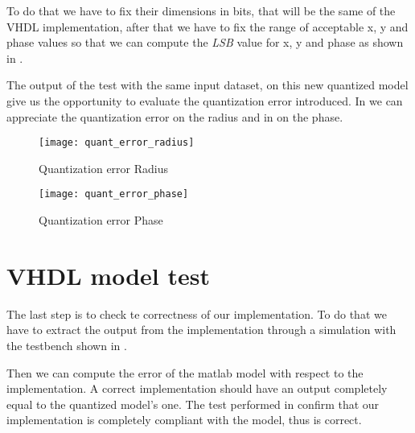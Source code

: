 To do that we have to fix their dimensions in bits, that will be the same of the
VHDL implementation, after that we have to fix the range of acceptable x, y and
phase values so that we can compute the \emph{LSB} value for x, y and phase as
shown in .



The output of the test with the same input dataset, on this new quantized model
give us the opportunity to evaluate the quantization error introduced. In
 we can appreciate the quantization error on the radius
and in  on the phase.


\begin{figure}[ht]
	\texttt{[image: quant\_error\_radius]}
	\caption{Quantization error Radius}\label{fig:qerrorradius}
\end{figure}
\begin{figure}[ht]
	\texttt{[image: quant\_error\_phase]}
	\caption{Quantization error Phase}\label{fig:qerrorphase}
\end{figure}
\section{VHDL model test}
The last step is to check te correctness of our implementation. To do that we
have to extract the output from the implementation through a simulation with
the testbench shown in .




Then we can compute the error of the matlab model with respect to the
implementation. A correct implementation should have an output completely equal
to the quantized model's one.
The test performed in  confirm that our implementation is
completely compliant with the \matlab model, thus is correct.




